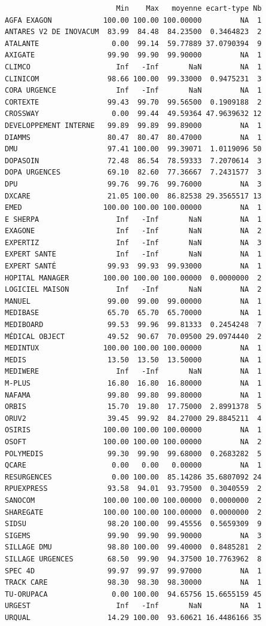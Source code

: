 \documentclass[]{article}
\begin{document}
\begin{verbatim}
                          Min    Max   moyenne ecart-type Nb
AGFA EXAGON            100.00 100.00 100.00000         NA  1
ANTARES V2 DE INOVACUM  83.99  84.48  84.23500  0.3464823  2
ATALANTE                 0.00  99.14  59.77889 37.0790394  9
AXIGATE                 99.90  99.90  99.90000         NA  1
CLIMCO                    Inf   -Inf       NaN         NA  1
CLINICOM                98.66 100.00  99.33000  0.9475231  3
CORA URGENCE              Inf   -Inf       NaN         NA  1
CORTEXTE                99.43  99.70  99.56500  0.1909188  2
CROSSWAY                 0.00  99.44  49.59364 47.9639632 12
DEVELOPPEMENT INTERNE   99.89  99.89  99.89000         NA  1
DIAMMS                  80.47  80.47  80.47000         NA  1
DMU                     97.41 100.00  99.39071  1.0119096 50
DOPASOIN                72.48  86.54  78.59333  7.2070614  3
DOPA URGENCES           69.10  82.60  77.36667  7.2431577  3
DPU                     99.76  99.76  99.76000         NA  3
DXCARE                  21.05 100.00  86.82538 29.3565517 13
EMED                   100.00 100.00 100.00000         NA  1
E SHERPA                  Inf   -Inf       NaN         NA  1
EXAGONE                   Inf   -Inf       NaN         NA  2
EXPERTIZ                  Inf   -Inf       NaN         NA  3
EXPERT SANTE              Inf   -Inf       NaN         NA  1
EXPERT SANTÉ            99.93  99.93  99.93000         NA  1
HOPITAL MANAGER        100.00 100.00 100.00000  0.0000000  2
LOGICIEL MAISON           Inf   -Inf       NaN         NA  2
MANUEL                  99.00  99.00  99.00000         NA  1
MEDIBASE                65.70  65.70  65.70000         NA  1
MEDIBOARD               99.53  99.96  99.81333  0.2454248  7
MÉDICAL OBJECT          49.52  90.67  70.09500 29.0974440  2
MEDINTUX               100.00 100.00 100.00000         NA  1
MEDIS                   13.50  13.50  13.50000         NA  1
MEDIWERE                  Inf   -Inf       NaN         NA  1
M-PLUS                  16.80  16.80  16.80000         NA  1
NAFAMA                  99.80  99.80  99.80000         NA  1
ORBIS                   15.70  19.80  17.75000  2.8991378  5
ORUV2                   39.45  99.92  84.27000 29.8845211  4
OSIRIS                 100.00 100.00 100.00000         NA  1
OSOFT                  100.00 100.00 100.00000         NA  2
POLYMEDIS               99.30  99.90  99.68000  0.2683282  5
QCARE                    0.00   0.00   0.00000         NA  1
RESURGENCES              0.00 100.00  85.14286 35.6807092 24
RPUEXPRESS              93.58  94.01  93.79500  0.3040559  2
SANOCOM                100.00 100.00 100.00000  0.0000000  2
SHAREGATE              100.00 100.00 100.00000  0.0000000  2
SIDSU                   98.20 100.00  99.45556  0.5659309  9
SIGEMS                  99.90  99.90  99.90000         NA  3
SILLAGE DMU             98.80 100.00  99.40000  0.8485281  2
SILLAGE URGENCES        68.50  99.90  94.37500 10.7763962  8
SPEC 4D                 99.97  99.97  99.97000         NA  1
TRACK CARE              98.30  98.30  98.30000         NA  1
TU-ORUPACA               0.00 100.00  94.65756 15.6655159 45
URGEST                    Inf   -Inf       NaN         NA  1
URQUAL                  14.29 100.00  93.60621 16.4486166 35
\end{verbatim}
\end{document}
